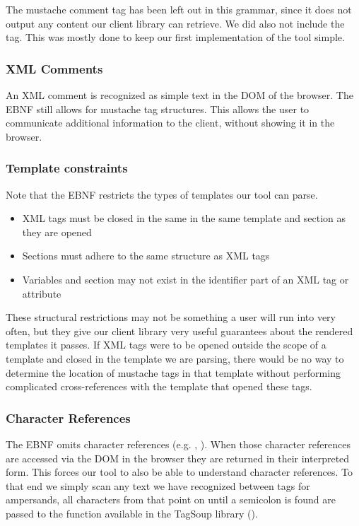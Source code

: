 The mustache comment tag has been left out in this grammar, since it does not
output any content our client library can retrieve. We did also not include the
 tag. This was mostly done to keep our first
implementation of the tool simple.

\subsubsection{XML Comments}
An XML comment is recognized as simple text in the DOM of the browser. The EBNF
still allows for mustache tag structures. This allows the user to communicate
additional information to the client, without showing it in the browser.

\subsubsection{Template constraints}
Note that the EBNF restricts the types of
templates our tool can parse.

\begin{itemize}
\item XML tags must be closed in the same in the same template and section
      as they are opened
\item Sections must adhere to the same structure as XML tags
\item Variables and section may not exist in the identifier part of an XML tag
      or attribute
\end{itemize}

These structural restrictions may not be something a user will run into very
often, but they give our client library very useful guarantees about the
rendered templates it passes.
If XML tags were to be opened outside the scope of a template
and closed in the template we are parsing,
there would be no way to determine the location of mustache tags in
that template without performing complicated cross-references with the template
that opened these tags.

\subsubsection{Character References}
The EBNF omits character references (e.g. , ).
When those character references are accessed via the DOM in the browser they are
returned in their interpreted form. This forces our tool to also be able to
understand character references. To that end we simply scan any text we have
recognized between tags for ampersands, all characters from that point on until
a semicolon is found are passed to the  function available
in the TagSoup library ().

